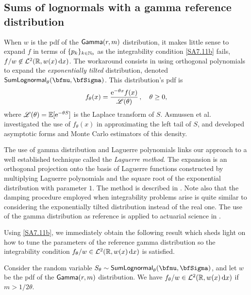 \subsection{Sums of lognormals with a gamma reference distribution} \label{SS:LNGammaNu}

When $w$ is the pdf of the $\mathsf{Gamma}(r,m)$ distribution, it makes little sense to expand $f$ in terms of $\{p_{k}\}_{k\in\mathbb{N}_0}$ as the integrability condition \eqref{SA7.11b} fails, $f/w \not\in\mathcal{L}^2(\mathbb{R}, w(x) \mathop{}\!\mathrm{d} x)$. The workaround consists in using orthogonal polynomials to expand the \emph{exponentially tilted} distribution, denoted $\SLNDist_\theta(\bfmu, \bfSigma)$. This distribution's pdf is
\begin{equation}\label{ExponentiallyTiltedPDF}
f_\theta(x) = \frac{\mathrm{e}^{-\theta x}f(x)}{\mathscr{L}(\theta)} \,,\quad \theta \ge 0,
\end{equation}
where $\mathscr{L}(\theta)=\operatorname{{\mathbb E}}[\mathrm{e}^{-\theta S}]$ is the Laplace transform of $S$. Asmussen et al.\ \cite{asmussen2015exponential} investigated the use of $f_\theta(x)$ in approximating the left tail of $S$, and developed asymptotic forms and Monte Carlo estimators of this density.
\begin{remark}
The use of gamma distribution and Laguerre polynomials links our approach to a well established technique called the \emph{Laguerre method}. The expansion is an orthogonal projection onto the basis of Laguerre functions constructed by multiplying Laguerre polynomials and the square root of the exponential distribution with parameter $1$. The method is described in \cite{Abate1995}. Note also that the damping procedure employed when integrability problems arise is quite similar to considering the exponentially tilted distribution instead of the real one. The use of the gamma distribution as reference is applied to actuarial science in \cite{GoLoPo16,GoLoPo15}.
\remQED
\end{remark}
Using \eqref{SA7.11b}, we immediately obtain the following result which
sheds light on how to tune the parameters of the reference gamma distribution so the integrability condition $f_\theta / w \in\mathcal{L}^2(\mathbb{R}, w(x) \mathop{}\!\mathrm{d} x)$ is satisfied.
\begin{proposition}\label{pr:IntegrabiltyConditionWRTGammaDistribution}
Consider the random variable $S_\theta \sim \SLNDist_\theta(\bfmu,\bfSigma)$, and let $w$ be the pdf of the $\mathsf{Gamma}(r,m)$ distribution. We have $f_\theta/w \in\mathcal{L}^2(\mathbb{R}, w(x) \mathop{}\!\mathrm{d} x)$ if
$m>1/2\theta$.
\end{proposition}

